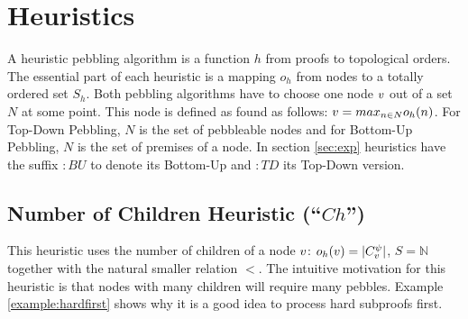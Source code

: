 \documentclass{llncs}
\begin{document}
\section{Heuristics}
\label{sec:heuristics}

A heuristic pebbling algorithm is a function $h$ from proofs to topological orders.
The essential part of each heuristic is a mapping $o_h$ from nodes to a totally ordered set $S_h$.
Both pebbling algorithms have to choose one node $v$ out of a set $N$ at some point. This node is defined as found as follows: $v = max_{n \in N} o_h(n)$.
For Top-Down Pebbling, $N$ is the set of pebbleable nodes and for Bottom-Up Pebbling, $N$ is the set of premises of a node.
In section \ref{sec:exp} heuristics have the suffix $:BU$ to denote its Bottom-Up and $:TD$ its Top-Down version.

\subsection{Number of Children Heuristic (``$Ch$'')}
\label{sec:children}
This heuristic uses the number of children of a node $v$: $o_h(v) = |C_{v}^{\psi}|$, $S = \mathbb{N}$ together with the natural smaller relation $<$.
The intuitive motivation for this heuristic is that nodes with many children will require many pebbles. Example \ref{example:hardfirst} shows why it is a good idea to process hard subproofs first.
\end{document}
